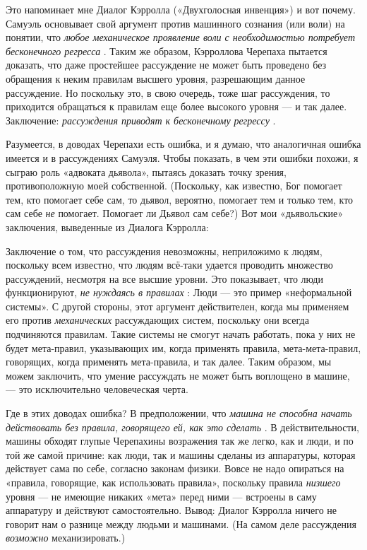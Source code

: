\documentclass[../main.tex]{subfiles}
\begin{document}
Это напоминает мне Диалог Кэрролла («Двухголосная инвенция») и вот почему. Самуэль основывает свой аргумент против машинного сознания (или воли) на понятии, что \emph{любое механическое проявление воли с необходимостью потребует бесконечного регресса} . Таким же образом, Кэрроллова Черепаха пытается доказать, что даже простейшее рассуждение не может быть проведено без обращения к неким правилам высшего уровня, разрешающим данное рассуждение. Но поскольку это, в свою очередь, тоже шаг рассуждения, то приходится обращаться к правилам еще более высокого уровня --- и так далее. Заключение: \emph{рассуждения приводят к бесконечному регрессу} .

Разумеется, в доводах Черепахи есть ошибка, и я думаю, что аналогичная ошибка имеется и в рассуждениях Самуэля. Чтобы показать, в чем эти ошибки похожи, я сыграю роль «адвоката дьявола», пытаясь доказать точку зрения, противоположную моей собственной. (Поскольку, как известно, Бог помогает тем, кто помогает себе сам, то дьявол, вероятно, помогает тем и только тем, кто сам себе \emph{не} помогает. Помогает ли Дьявол сам себе?) Вот мои «дьявольские» заключения, выведенные из Диалога Кэрролла:

Заключение о том, что рассуждения невозможны, неприложимо к людям, поскольку всем известно, что людям всё-таки удается проводить множество рассуждений, несмотря на все высшие уровни. Это показывает, что люди функционируют, \emph{не нуждаясь в правилах} : Люди --- это пример «неформальной системы». С другой стороны, этот аргумент действителен, когда мы применяем его против \emph{механических} рассуждающих систем, поскольку они всегда подчиняются правилам. Такие системы не смогут начать работать, пока у них не будет мета-правил, указывающих им, когда применять правила, мета-мета-правил, говорящих, когда применять мета-правила, и так далее. Таким образом, мы можем заключить, что умение рассуждать не может быть воплощено в машине, --- это исключительно человеческая черта.

Где в этих доводах ошибка? В предположении, что \emph{машина не способна начать действовать без правила, говорящего ей, как это сделать} . В действительности, машины обходят глупые Черепахины возражения так же легко, как и люди, и по той же самой причине: как люди, так и машины сделаны из аппаратуры, которая действует сама по себе, согласно законам физики. Вовсе не надо опираться на «правила, говорящие, как использовать правила», поскольку правила \emph{низшего} уровня --- не имеющие никаких «мета» перед ними --- встроены в саму аппаратуру и действуют самостоятельно. Вывод: Диалог Кэрролла ничего не говорит нам о разнице между людьми и машинами. (На самом деле рассуждения \emph{возможно} механизировать.)
\end{document}
